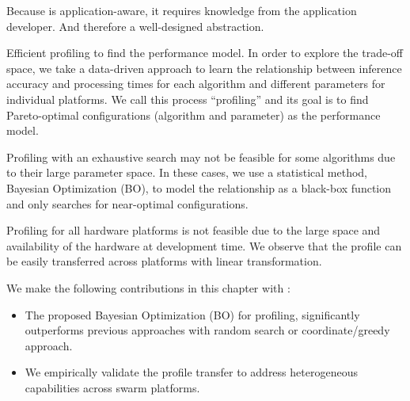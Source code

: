 Because \brt{} is application-aware, it requires knowledge from the application
developer. And therefore a well-designed abstraction.

Efficient profiling to find the performance model. In order to explore the
trade-off space, we take a data-driven approach to learn the relationship
between inference accuracy and processing times for each algorithm and different
parameters for individual platforms. We call this process ``profiling'' and its
goal is to find Pareto-optimal configurations (algorithm and parameter) as the
performance model.

Profiling with an exhaustive search may not be feasible for some algorithms due
to their large parameter space. In these cases, we use a statistical method,
Bayesian Optimization (BO), to model the relationship as a black-box function
and only searches for near-optimal configurations.

Profiling for all hardware platforms is not feasible due to the large space and
availability of the hardware at development time. We observe that the profile
can be easily transferred across platforms with linear transformation.

We make the following contributions in this chapter with \brt{}:

\begin{itemize}

\item The proposed Bayesian Optimization (BO) for profiling, significantly
  outperforms previous approaches with random search or coordinate/greedy
  approach.
\item We empirically validate the profile transfer to address heterogeneous
  capabilities across swarm platforms.

\end{itemize}


